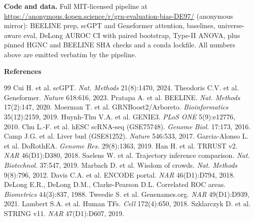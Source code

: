 \documentclass[sigconf, nonacm, anonymous]{acmart}
\begin{document}
\textbf{Code and data.} Full MIT-licensed pipeline at
\url{https://anonymous.4open.science/r/grn-evaluation-bias-DE97/}
(anonymous mirror): BEELINE prep, scGPT and Geneformer attention,
baselines, universe-aware eval, DeLong AUROC CI with paired bootstrap,
Type-II ANOVA, plus pinned HGNC and BEELINE SHA checks and a conda
lockfile. All numbers above are emitted verbatim by the pipeline.

\smallskip\noindent\textbf{\footnotesize References}
\begingroup
\scriptsize
\renewcommand{\section}[2]{}
\setlength{\bibsep}{0pt}
\begin{thebibliography}{99}
 Cui H. et al. scGPT. \emph{Nat. Methods} 21(8):1470, 2024.
 Theodoris C.V. et al. Geneformer. \emph{Nature} 618:616, 2023.
 Pratapa A. et al. BEELINE. \emph{Nat. Methods} 17(2):147, 2020.
 Moerman T. et al. GRNBoost2/Arboreto. \emph{Bioinformatics} 35(12):2159, 2019.
 Huynh-Thu V.A. et al. GENIE3. \emph{PLoS ONE} 5(9):e12776, 2010.
 Chu L.-F. et al. hESC scRNA-seq (GSE75748). \emph{Genome Biol.} 17:173, 2016.
 Camp J.G. et al. Liver bud (GSE81252). \emph{Nature} 546:533, 2017.
 Garcia-Alonso L. et al. DoRothEA. \emph{Genome Res.} 29(8):1363, 2019.
 Han H. et al. TRRUST v2. \emph{NAR} 46(D1):D380, 2018.
 Saelens W. et al. Trajectory inference comparison. \emph{Nat. Biotechnol.} 37:547, 2019.
 Marbach D. et al. Wisdom of crowds. \emph{Nat. Methods} 9(8):796, 2012.
 Davis C.A. et al. ENCODE portal. \emph{NAR} 46(D1):D794, 2018.
 DeLong E.R., DeLong D.M., Clarke-Pearson D.L. Correlated ROC areas. \emph{Biometrics} 44(3):837, 1988.
 Tweedie S. et al. Genenames.org. \emph{NAR} 49(D1):D939, 2021.
 Lambert S.A. et al. Human TFs. \emph{Cell} 172(4):650, 2018.
 Szklarczyk D. et al. STRING v11. \emph{NAR} 47(D1):D607, 2019.
\end{thebibliography}
\endgroup
\end{document}
